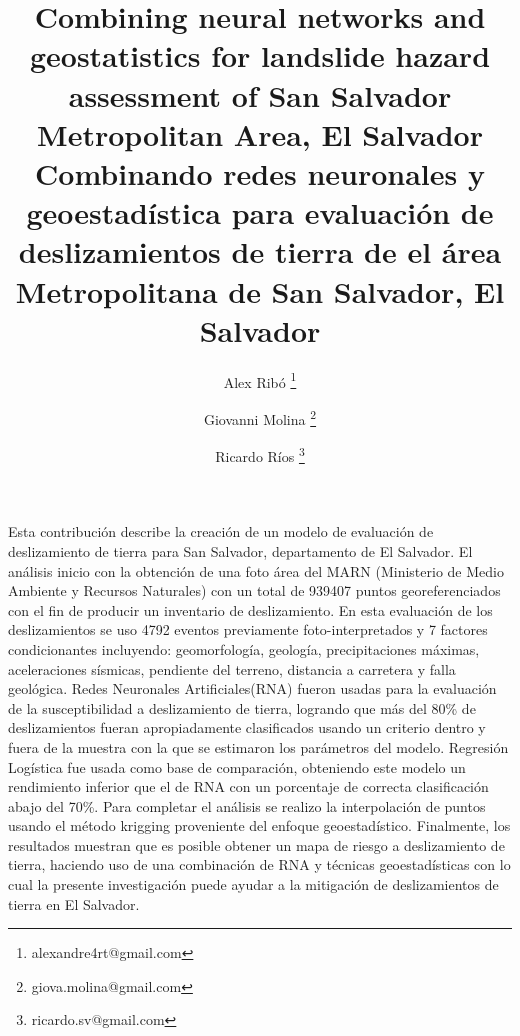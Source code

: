 \documentclass[11pt,twoside]{rmta2010esp}%
\begin{document}
\title{Combining neural networks and geostatistics for landslide hazard assessment of San Salvador Metropolitan Area, El Salvador 
\newline
\newline
Combinando redes neuronales y geoestad\'{i}stica para evaluaci\'{o}n de deslizamientos de tierra de el \'{a}rea Metropolitana de San Salvador, El Salvador}

\author[1]{Alex Rib\'{o} \thanks{alexandre4rt@gmail.com }}
\author[2]{Giovanni Molina \thanks{giova.molina@gmail.com}}
\author[3]{Ricardo Ríos \thanks{ricardo.sv@gmail.com}}





\maketitle


\begin{resumen}
Esta contribución describe la creación de un modelo de evaluación de deslizamiento de tierra para San Salvador, departamento de El Salvador. El análisis inicio con la obtención de una foto área del MARN (Ministerio de Medio Ambiente y Recursos Naturales) con un total de 939407 puntos georeferenciados con el fin de producir un inventario de deslizamiento. En esta evaluación de los deslizamientos se uso 4792 eventos previamente foto-interpretados y 7 factores condicionantes incluyendo: geomorfología, geología, precipitaciones máximas, aceleraciones sísmicas, pendiente del terreno, distancia a carretera y falla geológica. Redes Neuronales Artificiales(RNA) fueron usadas para la evaluación de la susceptibilidad a deslizamiento de tierra, logrando que más del 80\% de deslizamientos fueran apropiadamente clasificados usando un criterio dentro y fuera de la muestra con la que se estimaron los parámetros del modelo. Regresión Logística fue usada como base de comparación, obteniendo este modelo un rendimiento inferior que el de RNA con un porcentaje de correcta clasificación abajo del 70\%. Para completar el análisis se realizo la interpolación de puntos usando el método krigging proveniente del enfoque geoestadístico. Finalmente, los resultados muestran que es posible obtener un mapa de riesgo a deslizamiento de tierra, haciendo uso de una combinación de RNA y técnicas geoestadísticas con lo cual la presente investigación puede ayudar a la mitigación de deslizamientos de tierra en El Salvador.
\end{resumen}
\end{document}
